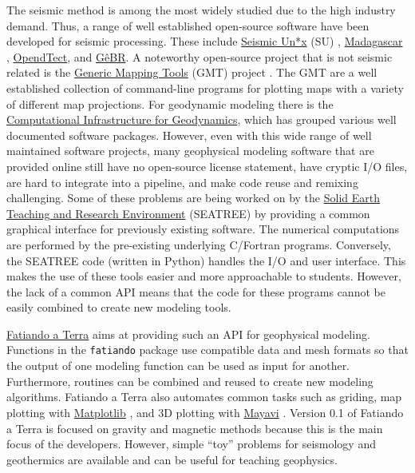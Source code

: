 The seismic method is among the most widely studied due to the high
industry demand. Thus, a range of well established open-source software
have been developed for seismic processing. These include
\href{http://www.cwp.mines.edu/cwpcodes/}{Seismic Un*x} (SU)
\citep{stockwelljr.1999},
\href{http://www.ahay.org/}{Madagascar} \citep{madagascardevelopmentteam2013},
\href{http://opendtect.org}{OpendTect}, and
\href{http://www.gebrproject.com}{GêBR}. A noteworthy open-source
project that is not seismic related is the
\href{http://gmt.soest.hawaii.edu/}{Generic Mapping Tools}
(GMT) project
\citet{wessel1991}. The GMT are a well established collection of command-line
programs for plotting maps with a variety of different map projections.
For geodynamic modeling there is the
\href{http://www.geodynamics.org}{Computational Infrastructure for
Geodynamics}, which has grouped various well documented software
packages. However, even with this wide range of well maintained software
projects, many geophysical modeling software that are provided online
still have no open-source license statement, have cryptic I/O files, are
hard to integrate into a pipeline, and make code reuse and remixing
challenging. Some of these problems are being worked on by the
\href{http://geosys.usc.edu/projects/seatree/}{Solid Earth Teaching and
Research Environment} (SEATREE) \citet{milner2009} by providing a common
graphical interface for previously existing software. The numerical
computations are performed by the pre-existing underlying C/Fortran
programs. Conversely, the SEATREE code (written in Python) handles the
I/O and user interface. This makes the use of these tools easier and
more approachable to students. However, the lack of a common API means
that the code for these programs cannot be easily combined to create new
modeling tools.

\href{http://www.fatiando.org}{Fatiando a Terra} aims at providing such an API
for geophysical modeling. Functions in the \texttt{fatiando} package use
compatible data and mesh formats so that the output of one modeling function
can be used as input for another. Furthermore, routines can be combined and
reused to create new modeling algorithms.  Fatiando a Terra also automates
common tasks such as griding, map plotting with
\href{http://matplotlib.org}{Matplotlib} \citep{hunter2007}, and 3D plotting
with \href{http://code.enthought.com/projects/mayavi}{Mayavi}
\citep{ramachandran2011}.  Version 0.1 of Fatiando a Terra is focused on
gravity and magnetic methods because this is the main focus of the developers.
However, simple ``toy'' problems for seismology and geothermics are available
and can be useful for teaching geophysics.

